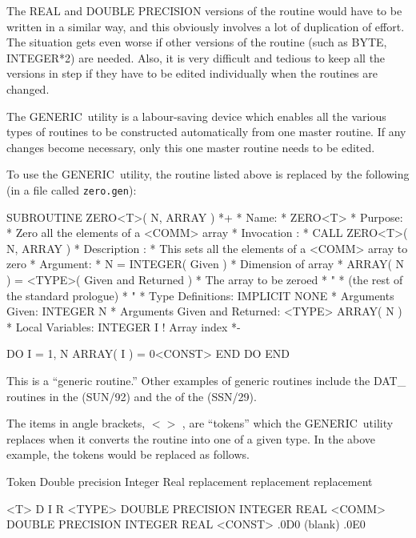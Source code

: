 \documentclass[twoside,11pt,nolof]{starlink}
\providecommand{\GENERIC}{{\footnotesize GENERIC}\normalsize}
\begin{document}
The REAL and DOUBLE PRECISION versions of the routine would have to be
written in a similar way, and this obviously involves a lot of
duplication of effort.
The situation gets even worse if other versions of the routine
(such as BYTE, INTEGER*2) are needed.
Also, it is very difficult and tedious to keep all the versions
in step if they have to be edited individually when the routines
are changed.

The \GENERIC\ utility is a labour-saving device which enables all the
various types of routines to be constructed automatically from
one master routine.
If any changes become necessary, only this one master routine needs
to be edited.

To use the \GENERIC\ utility, the routine listed above is replaced by
the following (in a file called \texttt{zero.gen}):

\begin{terminalv}
          SUBROUTINE ZERO<T>( N, ARRAY )
    *+
    *  Name:
    *     ZERO<T>
    *  Purpose:
    *     Zero all the elements of a <COMM> array
    *  Invocation :
    *     CALL ZERO<T>( N, ARRAY )
    *  Description :
    *     This sets all the elements of a <COMM> array to zero
    *  Argument:
    *     N = INTEGER( Given )
    *        Dimension of array
    *     ARRAY( N ) = <TYPE>( Given and Returned )
    *        The array to be zeroed
    *                   "
    *     (the rest of the standard prologue)
    *                   "
    *  Type Definitions:
          IMPLICIT NONE
    *  Arguments Given:
          INTEGER N
    *  Arguments Given and Returned:
          <TYPE> ARRAY( N )
    *  Local Variables:
          INTEGER I                  ! Array index
    *-

          DO I = 1, N
             ARRAY( I ) = 0<CONST>
          END DO
          END
\end{terminalv}

This is a ``generic routine.''
Other examples of generic routines include the DAT\_ routines in
the  (SUN/92) and the
 of the  (SSN/29).

The items in angle brackets, $<>$ , are ``tokens'' which the
\GENERIC\ utility replaces when it converts the routine into one
of a given type.
In the above example, the tokens would be replaced
as follows.

\begin{terminalv}
       Token       Double precision    Integer       Real
                   replacement         replacement   replacement

       <T>         D                   I             R
       <TYPE>      DOUBLE PRECISION    INTEGER       REAL
       <COMM>      DOUBLE PRECISION    INTEGER       REAL
       <CONST>     .0D0                (blank)       .0E0
\end{terminalv}
\end{document}
